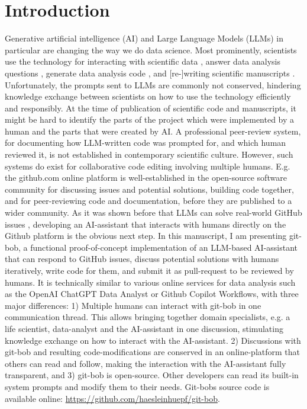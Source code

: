 \documentclass[times, twoside]{zHenriquesLab-StyleBioRxiv}
\begin{document}
\section*{Introduction}

Generative artificial intelligence (AI) and Large Language Models (LLMs) in particular are changing the way we do data science. Most prominently, scientists use the technology for interacting with scientific data \cite{Royer2023}, answer data analysis questions \cite{Lai2022DS1000, lei2024bioimage}, generate data analysis code \cite{royer2023omega, benchmark_llm_bia, chen2021evaluating}, and [re-]writing scientific manuscripts \cite{lu2024aiscientist}. Unfortunately, the prompts sent to LLMs are commonly not conserved, hindering knowledge exchange between scientists on how to use the technology efficiently and responsibly. At the time of publication of scientific code and manuscripts, it might be hard to identify the parts of the project which were implemented by a human and the parts that were created by AI. A professional peer-review system, for documenting how LLM-written code was prompted for, and which human reviewed it, is not established in contemporary scientific culture. However, such systems do exist for collaborative code editing involving multiple humans. E.g. the github.com online platform is well-established in the open-source software community for discussing issues and potential solutions, building code together, and for peer-reviewing code and documentation, before they are published to a wider community. As it was shown before that LLMs can solve real-world GitHub issues \cite{jimenez2024swebenchlanguagemodelsresolve}, developing an AI-assistant that interacts with humans directly on the Github platform is the obvious next step. In this manuscript, I am presenting git-bob, a functional proof-of-concept implementation of an LLM-based AI-assistant that can respond to GitHub issues, discuss potential solutions with humans iteratively, write code for them, and submit it as pull-request to be reviewed by humans. It is technically similar to various online services for data analysis such as the OpenAI ChatGPT Data Analyst or Github Copilot Workflows, with three major differences: 1) Multiple humans can interact with git-bob in one communication thread. This allows bringing together domain specialists, e.g. a life scientist, data-analyst and the AI-assistant in one discussion, stimulating knowledge exchange on how to interact with the AI-assistant. 2) Discussions with git-bob and resulting code-modifications are conserved in an online-platform that others can read and follow, making the interaction with the AI-assistant fully transparent, and 3) git-bob is open-source. Other developers can read its built-in system prompts and modify them to their needs.  Git-bobs source code is available online: \url{https://github.com/haesleinhuepf/git-bob}.
\end{document}
